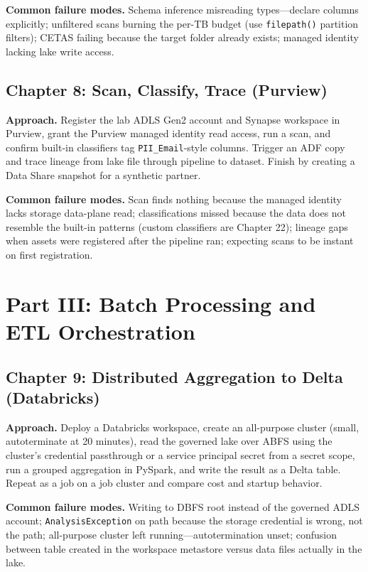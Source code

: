 \textbf{Common failure modes.} Schema inference misreading types---declare columns explicitly;
unfiltered scans burning the per-TB budget (use \texttt{filepath()} partition filters); CETAS
failing because the target folder already exists; managed identity lacking lake write access.

\subsection*{Chapter 8: Scan, Classify, Trace (Purview)}
\textbf{Approach.} Register the lab ADLS Gen2 account and Synapse workspace in Purview, grant
the Purview managed identity read access, run a scan, and confirm built-in classifiers tag
\texttt{PII\_Email}-style columns. Trigger an ADF copy and trace lineage from lake file through
pipeline to dataset. Finish by creating a Data Share snapshot for a synthetic partner.

\textbf{Common failure modes.} Scan finds nothing because the managed identity lacks storage
data-plane read; classifications missed because the data does not resemble the built-in patterns
(custom classifiers are Chapter 22); lineage gaps when assets were registered after the pipeline
ran; expecting scans to be instant on first registration.

\section{Part III: Batch Processing and ETL Orchestration}

\subsection*{Chapter 9: Distributed Aggregation to Delta (Databricks)}
\textbf{Approach.} Deploy a Databricks workspace, create an all-purpose cluster (small, autoterminate
at 20 minutes), read the governed lake over ABFS using the cluster's credential passthrough or a
service principal secret from a secret scope, run a grouped aggregation in PySpark, and write the
result as a Delta table. Repeat as a job on a job cluster and compare cost and startup behavior.

\textbf{Common failure modes.} Writing to DBFS root instead of the governed ADLS account;
\texttt{AnalysisException} on path because the storage credential is wrong, not the path;
all-purpose cluster left running---autotermination unset; confusion between table created in the
workspace metastore versus data files actually in the lake.

